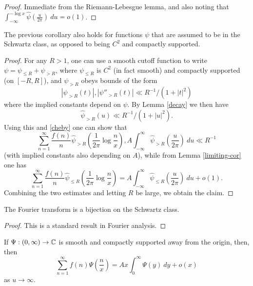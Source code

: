 \begin{proof}
 Immediate from the Riemann-Lebesgue lemma, and also noting that $\int_{-\infty}^{-\log x} \hat \psi(\frac{u}{2\pi})\ du = o(1)$.
\end{proof}



\begin{lemma}\label{schwarz-id}  The previous corollary also holds for functions $\psi$ that are assumed to be in the Schwartz class, as opposed to being $C^2$ and compactly supported.
\end{lemma}



\begin{proof}
For any $R>1$, one can use a smooth cutoff function to write $\psi = \psi_{\leq R} + \psi_{>R}$, where $\psi_{\leq R}$ is $C^2$ (in fact smooth) and compactly supported (on $[-R,R]$), and $\psi_{>R}$ obeys bounds of the form
$$ |\psi_{>R}(t)|, |\psi''_{>R}(t)| \ll R^{-1} / (1 + |t|^2) $$
where the implied constants depend on $\psi$.  By Lemma \ref{decay} we then have
$$ \hat \psi_{>R}(u) \ll R^{-1} / (1+|u|^2).$$
Using this and \eqref{cheby} one can show that
$$ \sum_{n=1}^\infty \frac{f(n)}{n} \hat \psi_{>R}( \frac{1}{2\pi} \log \frac{n}{x} ), A \int_{-\infty}^\infty \hat \psi_{>R} (\frac{u}{2\pi})\ du \ll R^{-1} $$
(with implied constants also depending on $A$), while from Lemma \ref{limiting-cor} one has
$$ \sum_{n=1}^\infty \frac{f(n)}{n} \hat \psi_{\leq R}( \frac{1}{2\pi} \log \frac{n}{x} ) = A \int_{-\infty}^\infty \hat \psi_{\leq R} (\frac{u}{2\pi})\ du + o(1).$$
Combining the two estimates and letting $R$ be large, we obtain the claim.
\end{proof}



\begin{lemma}\label{bij}  The Fourier transform is a bijection on the Schwartz class.
\end{lemma}



\begin{proof}  This is a standard result in Fourier analysis.
\end{proof}



\begin{corollary}\label{WienerIkeharaSmooth}
  If $\Psi: (0,\infty) \to \C$ is smooth and compactly supported away from the origin, then, then
$$ \sum_{n=1}^\infty f(n) \Psi( \frac{n}{x} ) = A x \int_0^\infty \Psi(y)\ dy + o(x)$$
as $u \to \infty$.
\end{corollary}



